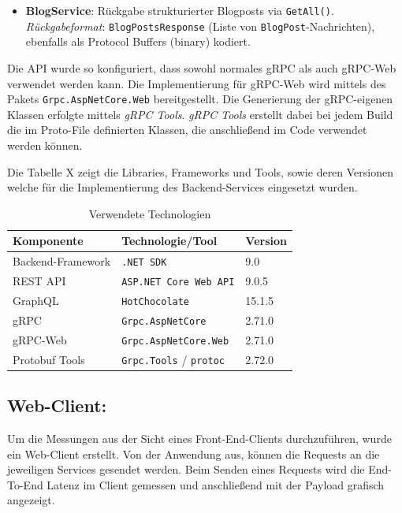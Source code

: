 \begin{enumerate}
\begin{itemize}
		\item \textbf{BlogService}: Rückgabe strukturierter Blogposts via \texttt{GetAll()}.\\
		\emph{Rückgabeformat}: \texttt{BlogPostsResponse} (Liste von \texttt{BlogPost}-Nachrichten), ebenfalls als Protocol Buffers (binary) kodiert.
	\end{itemize}
	
	Die API wurde so konfiguriert, dass sowohl normales gRPC als auch gRPC-Web verwendet werden kann. Die Implementierung für gRPC-Web wird mittels des Pakets \texttt{Grpc.AspNetCore.Web} bereitgestellt. Die Generierung der gRPC-eigenen Klassen erfolgte mittels \emph{gRPC Tools}. \emph{gRPC Tools} erstellt dabei bei jedem Build die im Proto-File definierten Klassen, die anschließend im Code verwendet werden können.
	
	Die Tabelle X zeigt die Libraries, Frameworks und Tools, sowie deren Versionen welche für die Implementierung des Backend-Services eingesetzt wurden.
	
	\begin{table}[h]
		\centering
		\caption{Verwendete Technologien}
		\begin{tabular}{lll}
			\hline
			\textbf{Komponente} & \textbf{Technologie/Tool} & \textbf{Version} \\
			\hline
			Backend-Framework & \texttt{.NET~SDK} & 9.0 \\
			REST API & \texttt{ASP.NET~Core~Web~API} & 9.0.5 \\
			GraphQL & \texttt{HotChocolate} & 15.1.5 \\
			gRPC & \texttt{Grpc.AspNetCore} & 2.71.0 \\
			gRPC-Web & \texttt{Grpc.AspNetCore.Web} & 2.71.0 \\
			Protobuf Tools & \texttt{Grpc.Tools} / \texttt{protoc} & 2.72.0 \\
			\hline
		\end{tabular}
	\end{table}
	
	\subsection{Web-Client:}
	Um die Messungen aus der Sicht eines Front-End-Clients durchzuführen, wurde ein Web-Client erstellt. Von der Anwendung aus, können die  Requests an die jeweiligen Services gesendet werden. Beim Senden eines Requests wird die End-To-End Latenz im Client gemessen und anschließend mit der Payload grafisch angezeigt.  
	

\end{enumerate}
